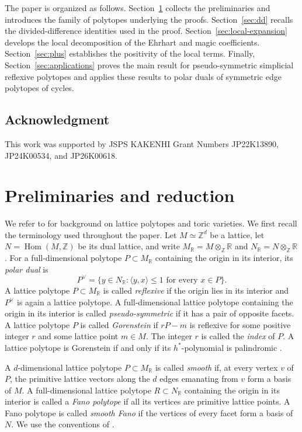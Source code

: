 \documentclass[12pt]{amsart}
\theoremstyle{definition}
\newcommand{\ZZ}{\mathbb Z}
\newcommand{\RR}{\mathbb R}
\begin{document}
The paper is organized as follows.  Section~\ref{sec:closure} collects
the preliminaries and introduces the family of polytopes underlying
the proofs.  Section~\ref{sec:dd} recalls the divided-difference
identities used in the proof.  Section~\ref{sec:local-expansion} develops
the local decomposition of the Ehrhart and magic coefficients.
Section~\ref{sec:plus} establishes the positivity of the local terms.
Finally, Section~\ref{sec:applications} proves the main result for
pseudo-symmetric simplicial reflexive polytopes and applies these results
to polar duals of symmetric edge polytopes of cycles.

\subsection*{Acknowledgment}
This work was supported by JSPS KAKENHI Grant Numbers
JP22K13890, JP24K00534, and JP26K00618.

\section{Preliminaries and reduction}\label{sec:closure}

We refer to \cite{CoxLittleSchenck} for background on lattice polytopes
and toric varieties.  We first recall the terminology used throughout
the paper. Let $M\simeq
\ZZ^d$ be a lattice, let $N=\operatorname{Hom}(M,\ZZ)$ be its dual lattice,
and write $M_{\RR}=M\otimes_{\ZZ}\RR$ and $N_{\RR}=N\otimes_{\ZZ}\RR$.
For a full-dimensional polytope $P\subset M_{\RR}$ containing the origin in
its interior, its \emph{polar dual} is
\[
P^\vee
=
\{y\in N_{\RR}:\langle y,x\rangle\le1\text{ for every }x\in P\}.
\]
A lattice polytope $P\subset M_{\RR}$ is called \emph{reflexive} if the
origin lies in its interior and $P^\vee$ is again a lattice polytope.
A full-dimensional lattice polytope containing the origin in its
interior is called \emph{pseudo-symmetric} if it has a pair of
opposite facets.
A lattice polytope $P$ is called \emph{Gorenstein} if $rP-m$ is reflexive
for some positive integer $r$ and some lattice point $m\in M$.
The integer $r$ is called the \emph{index} of $P$.
A lattice polytope is Gorenstein if and only if its $h^*$-polynomial is
palindromic \cite{HibiDual,FerroniHigashitani}.

A $d$-dimensional lattice polytope $P\subset M_{\RR}$ is called
\emph{smooth} if, at every vertex $v$ of $P$, the primitive lattice vectors
along the $d$ edges emanating from $v$ form a basis of $M$.  A
full-dimensional lattice polytope $R\subset N_{\RR}$ containing the origin
in its interior is called a \emph{Fano polytope} if all its vertices are
primitive lattice points.  A Fano polytope is called \emph{smooth Fano} if
the vertices of every facet form a basis of $N$. 
We use the conventions of
\cite{Ewald,EwaldBook,HaaseThesis}.
\end{document}
